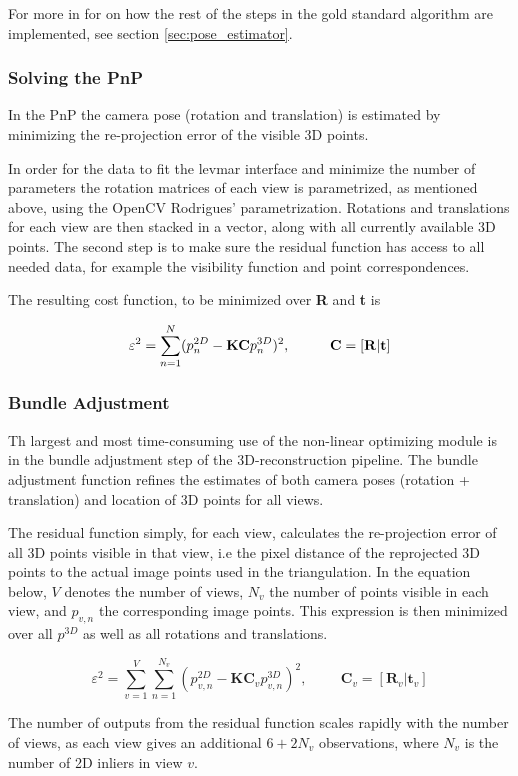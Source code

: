 For more in for on how the rest of the steps in the gold standard algorithm are implemented, see section \ref{sec:pose_estimator}.
\newpage

\subsubsection{Solving the PnP}
In the PnP the camera pose (rotation and translation) is estimated by minimizing the re-projection error of the visible 3D points.

In order for the data to fit the levmar interface and minimize the number of parameters the rotation matrices of each view is parametrized, as mentioned above, using the OpenCV Rodrigues' parametrization. Rotations and translations for each view are then stacked in a vector, along with all currently available 3D points. The second step is to make sure the residual function has access to all needed data, for example the visibility function and point correspondences.

The resulting cost function, to be minimized over \textbf{R} and \textbf{t} is

\begin{equation}
\label{eq:PnP}
\varepsilon^2 = \sum_{n=1}^{N} (p_n^{2D} - \textbf{KC}p_{n}^{3D})^2, \hspace{1cm} \textbf{C} = [\bf{R} | \bf{t}]
\end{equation} 

\subsubsection{Bundle Adjustment}
Th largest and most time-consuming use of the non-linear optimizing module is in the bundle adjustment step of the 3D-reconstruction pipeline. The bundle adjustment function refines the estimates of both camera poses (rotation + translation) and location of 3D points for all views. 

The residual function simply, for each view, calculates the re-projection error of all 3D points visible in that view, i.e the pixel distance of the reprojected 3D points to the actual image points used in the triangulation. In the equation below, $V$ denotes the number of views, $N_v$ the number of points visible in each view, and $p_{v,n}$ the corresponding image points. This expression is then minimized over all $p^{3D}$ as well as all rotations and translations. 

\begin{equation}
\label{eq:BA}
\varepsilon^2 = \sum_{v=1}^{V}\sum_{n=1}^{N_v} (p_{v,n}^{2D} - \textbf{KC}_vp_{v,n}^{3D})^2, \hspace{1cm} \textbf{C}_v = [\textbf{R}_v | \textbf{t}_v]
\end{equation} 


The number of outputs from the residual function scales rapidly with the number of views, as each view gives an additional $ 6 + 2N_v $ observations, where $ N_v $ is the number of 2D inliers in view $v$.





